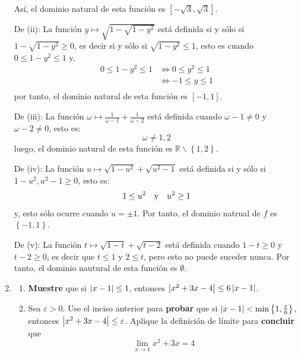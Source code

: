 \documentclass[12pt]{article}
\begin{document}
\begin{enumerate}
\begin{sol}
        Así, el dominio natural de esta función es $[-\sqrt{3},\sqrt{3}]$.

        De (ii): La función $y\mapsto\sqrt{1-\sqrt{1-y^2}}$ está definida si y sólo si $1-\sqrt{1-y^2}\geq0$, es decir si y sólo si $\sqrt{1-y^2}\leq1$, esto es cuando $0\leq1-y^2\leq 1$ y,
        \begin{equation*}
            \begin{split}
                0\leq1-y^2\leq 1&\iff 0\leq y^2\leq1\\
                &\iff -1\leq y\leq1\\
            \end{split}
        \end{equation*}
        por tanto, el dominio natural de esta función es $[-1,1]$.

        De (iii): La función $\omega\mapsto\frac{1}{\omega-1}+\frac{1}{\omega-2}$ está definida cuando $\omega-1\neq 0$ y $\omega-2\neq0$, esto es:
        \begin{equation*}
            \omega\neq1,2
        \end{equation*}
        luego, el dominio natural de esta función es $\mathbb{R}\backslash\left\{1,2 \right\}$.

        De (iv): La función $u\mapsto\sqrt{1-u^2}+\sqrt{u^2-1}$ está definida si y sólo si $1-u^2,u^2-1\geq0$, esto es:
        \begin{equation*}
            1\leq u^2\quad\textup{y}\quad u^2\geq1
        \end{equation*}
        y, esto sólo ocurre cuando $u=\pm1$. Por tanto, el dominio natrual de $f$ es $\left\{-1,1 \right\}$.

        De (v): La función $t\mapsto\sqrt{1-t}+\sqrt{t-2}$ está definida cuando $1-t\geq 0$ y $t-2\geq 0$, es decir que $t\leq 1$ y $2\leq t$, pero esto no puede suceder nunca. Por tanto, el dominio nautural de esta función es $\emptyset$.
    \end{sol}

    \item \begin{enumerate}
        \item \textbf{Muestre} que si $\left| x-1 \right|\leq 1$, entonces $\left| x^2+3x-4 \right|\leq 6\left| x-1 \right|$.
        \item Sea $\varepsilon>0$. Use el inciso anterior para \textbf{probar} que si $\left| x-1 \right|<\min\left\{1,\frac{\varepsilon}{6} \right\}$, entonces $\left| x^2+3x-4 \right|\leq\varepsilon$. Aplique la definición de límite para \textbf{concluir} que
        \begin{equation*}
            \lim_{x\rightarrow1}x^2+3x=4
        \end{equation*}
    \end{enumerate}


\end{enumerate}
\end{document}
